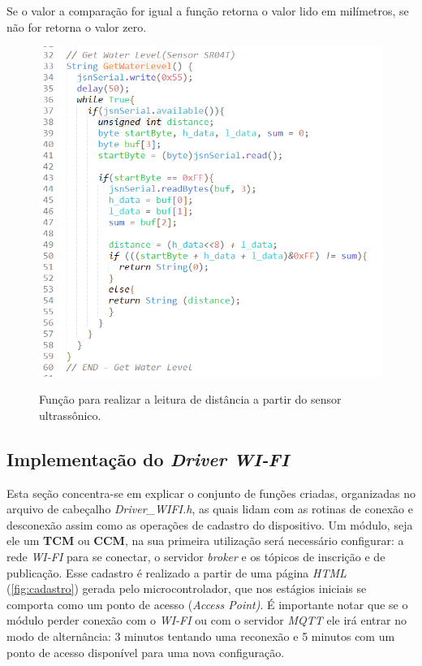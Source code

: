 Se o valor a comparação for igual a função retorna o valor lido em milímetros, se não for retorna o valor zero.


\begin{figure}[H]
	\centering
	\caption{Função para realizar a leitura de distância a partir do sensor ultrassônico.}
	\includegraphics[width=0.7
	\textwidth]{figuras/get_water_level.png}
	\label{fig:code_jsn-sr04t}
\end{figure}



\subsection {Implementação do \textit{Driver WI-FI}}

Esta seção concentra-se em explicar o conjunto de funções criadas, organizadas no arquivo de cabeçalho \textit{Driver\_WIFI.h}, as quais lidam com as rotinas de conexão e desconexão assim como as operações de cadastro do dispositivo. Um módulo, seja ele um \textbf{TCM} ou \textbf{CCM}, na sua primeira utilização será necessário configurar: a rede \textit{WI-FI} para se conectar, o servidor \textit{broker} e os tópicos de inscrição e de publicação. Esse cadastro é realizado a partir de uma página \textit{HTML} (\autoref{fig:cadastro}) gerada pelo microcontrolador, que nos estágios iniciais se comporta como um ponto de acesso (\textit{Access Point)}. É importante notar que se o módulo perder conexão com o \textit{WI-FI} ou com o servidor \textit{MQTT} ele irá entrar no modo de alternância: 3 minutos tentando uma reconexão e 5 minutos com um ponto de acesso disponível para uma nova configuração.

